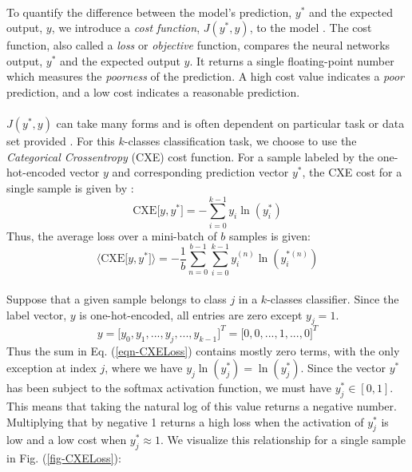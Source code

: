 \documentclass[12pt,letterpaper]{article}
\begin{document}
\paragraph*{}To quantify the difference between the model's prediction, $y^*$ and the expected output, $y$, we introduce a \textit{cost function}, $J(y^*,y)$, to the model \cite{Goodfellow,James}. The cost function, also called a \textit{loss} or \textit{objective} function, compares the neural networks output, $y^*$ and the expected output $y$. It returns a single floating-point number which measures the \textit{poorness} of the prediction. A high cost value indicates a \textit{poor} prediction, and a low cost indicates a reasonable prediction. 

\paragraph*{}$J(y^*,y)$ can take many forms and is often dependent on particular task or data set provided \cite{James}. For this $k$-classes classification task, we choose to use the \textit{Categorical Crossentropy} (CXE) cost function. For a sample labeled by the one-hot-encoded vector $y$ and corresponding prediction vector $y^*$, the CXE cost for a single sample is given by \cite{Goodfellow,Virtanen}:
\begin{equation}
\label{eqn-CXELoss}
\text{CXE}\big[ y , y^* \big] = - \sum_{i=0}^{k-1} y_i \ln(y^*_i) 
\end{equation}
Thus, the average loss over a mini-batch of $b$ samples is given:
\begin{equation}
\label{eqn-CXELossAvg}
\big\langle \text{CXE}\big[ y , y^* \big]\big\rangle = 
- \frac{1}{b}\sum_{n=0}^{b-1}\sum_{i=0}^{k-1} y_i^{(n)} \ln(y^{*(n)}_i) 
\end{equation}

\paragraph*{}Suppose that a given sample belongs to class $j$ in a $k$-classes classifier. Since the label vector, $y$ is one-hot-encoded, all entries are zero except $y_{j} = 1$.
\begin{equation}
y = \big[y_0,y_1, ... , y_{j} , ..., y_{k-1} \big]^T  = 
\big[0,0, ... , 1 , ...,0 \big]^T
\end{equation}
Thus the sum in Eq. (\ref{eqn-CXELoss}) contains mostly zero terms, with the only exception at index $j$, where we have $y_j\ln(y^*_j) = \ln(y^*_j)$. Since the vector $y^*$ has been subject to the softmax activation function, we must have $y^*_j \in [0,1]$. This means that taking the natural log of this value returns a negative number. Multiplying that by negative 1 returns a high loss when the activation of $y^*_j$ is low and a low cost when $y^*_j \approx 1$. We visualize this relationship for a single sample in Fig. (\ref{fig-CXELoss}):
\end{document}

